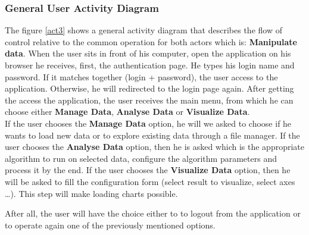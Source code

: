 \subsubsection{General User Activity Diagram}
The figure \ref{act3} shows a general activity diagram that describes the flow of control relative to the common operation for both actors which is: \textbf{Manipulate data}. When the user sits in front of his computer, open the application on his browser he receives, first, the authentication page. He types his login name and password. If it matches together (login + password), the user access to the application. Otherwise, he will redirected to the login page again. After getting the access the application, the user receives the main menu, from which he can choose either \textbf{Manage Data}, \textbf{Analyse Data} or \textbf{Visualize Data}. \\

 If the user chooses the \textbf{Manage Data} option, he will we asked to choose if he wants to load new data or to explore existing data through a file manager. If the user chooses the \textbf{Analyse Data} option, then he is asked which is the appropriate algorithm to run on selected data, configure the algorithm parameters and process it by the end. If the user chooses the \textbf{Visualize Data} option, then he will be asked to fill the configuration form (select result to visualize, select axes …). This step will make loading charts possible. 

After all, the user will have the choice either to to logout from the application or to operate again one of the previously mentioned options.\\


